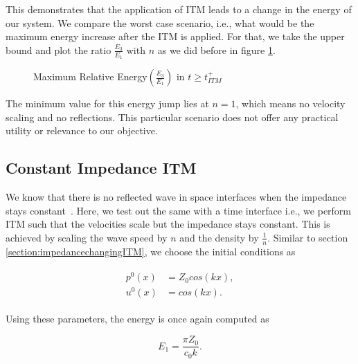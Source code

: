 This demonstrates that the application of \ac{ITM} leads to a change in the energy of our system. We compare the worst case scenario, i.e., what would be the maximum energy increase after the ITM is applied. For that,
 we take the upper bound and plot the ratio $\frac{E_3}{E_1}$ with $n$ as we did before in figure \ref{fig:ratio2}.

\begin{figure}
    \centering
    \caption{Maximum Relative Energy$\left(\frac{E_3}{E_1}\right)$ in $t \geq t_{ITM}^+$}
    \label{fig:ratio2}
\end{figure}

The minimum value for this energy jump lies at $n=1$, which means no velocity scaling and no reflections. This particular scenario does not offer any practical utility
or relevance to our objective.

\subsection{Constant Impedance \ac{ITM}}
We know that there is no reflected wave in space interfaces when the impedance stays constant~\parencite[Sec 9.7]{leveque_2002}. Here, we test out the same with a time interface i.e., we perform \ac{ITM} such that the velocities scale but the impedance stays constant. This is achieved by scaling the wave speed by $n$ and the density by $\frac{1}{n}$.
Similar to section \ref{section:impedancechangingITM}, we choose the initial conditions as

\begin{align}
    \begin{split}
        p^0\left(x\right) &= Z_0cos\left(kx\right), \\
        u^0\left(x\right) &= cos\left(kx\right) .
    \end{split}
    \label{eq:initialconditions2}
\end{align}

Using these parameters, the energy is once again computed as

\begin{equation}
    E_1 = \frac{\pi Z_0}{c_0 k} .
\end{equation}

